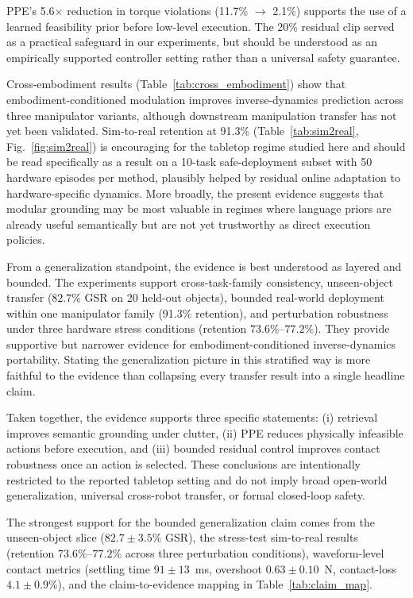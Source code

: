 \documentclass[12pt]{article}
\begin{document}
PPE's 5.6$\times$ reduction in torque violations (11.7\% $\rightarrow$ 2.1\%) supports the use of a learned feasibility prior before low-level execution. The 20\% residual clip served as a practical safeguard in our experiments, but should be understood as an empirically supported controller setting rather than a universal safety guarantee.

Cross-embodiment results (Table~\ref{tab:cross_embodiment}) show that embodiment-conditioned modulation improves inverse-dynamics prediction across three manipulator variants, although downstream manipulation transfer has not yet been validated. Sim-to-real retention at 91.3\% (Table~\ref{tab:sim2real}, Fig.~\ref{fig:sim2real}) is encouraging for the tabletop regime studied here and should be read specifically as a result on a 10-task safe-deployment subset with 50 hardware episodes per method, plausibly helped by residual online adaptation to hardware-specific dynamics. More broadly, the present evidence suggests that modular grounding may be most valuable in regimes where language priors are already useful semantically but are not yet trustworthy as direct execution policies.

From a generalization standpoint, the evidence is best understood as layered and bounded. The experiments support cross-task-family consistency, unseen-object transfer ($82.7\%$ GSR on 20 held-out objects), bounded real-world deployment within one manipulator family (91.3\% retention), and perturbation robustness under three hardware stress conditions (retention $73.6\%$--$77.2\%$). They provide supportive but narrower evidence for embodiment-conditioned inverse-dynamics portability. Stating the generalization picture in this stratified way is more faithful to the evidence than collapsing every transfer result into a single headline claim.

Taken together, the evidence supports three specific statements: (i) retrieval improves semantic grounding under clutter, (ii) PPE reduces physically infeasible actions before execution, and (iii) bounded residual control improves contact robustness once an action is selected. These conclusions are intentionally restricted to the reported tabletop setting and do not imply broad open-world generalization, universal cross-robot transfer, or formal closed-loop safety.

The strongest support for the bounded generalization claim comes from the unseen-object slice ($82.7\pm3.5\%$ GSR), the stress-test sim-to-real results (retention $73.6\%$--$77.2\%$ across three perturbation conditions), waveform-level contact metrics (settling time $91\pm13$~ms, overshoot $0.63\pm0.10$~N, contact-loss $4.1\pm0.9\%$), and the claim-to-evidence mapping in Table~\ref{tab:claim_map}.
\end{document}
